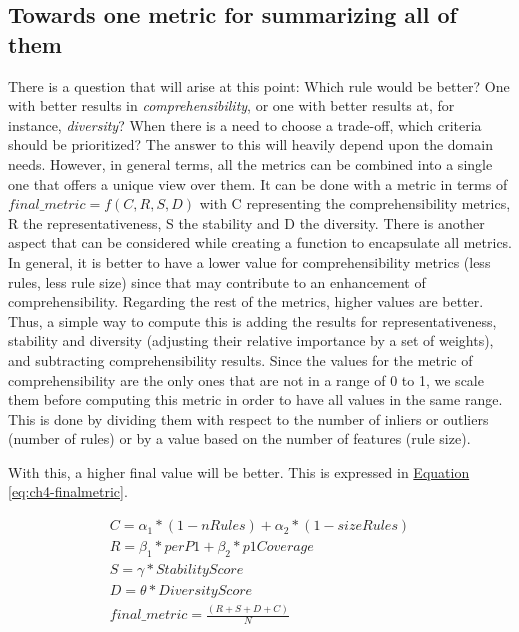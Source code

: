 \subsection{Towards one metric for summarizing all of them}\label{subsec:RuleExtractionOneMetric}
There is a question that will arise at this point: Which rule would be better? One with better results in \textit{comprehensibility}, or one with better results at, for instance, \textit{diversity}? When there is a need to choose a trade-off, which criteria should be prioritized? 
The answer to this will heavily depend upon the domain needs. However, in general terms, all the metrics can be combined into a single one that offers a unique view over them. It can be done with a metric in terms of $final\_metric = f(C, R, S, D)$ with C representing the comprehensibility metrics, R the representativeness, S the stability and D the diversity. There is another aspect that can be considered while creating a function to encapsulate all metrics. In general, it is better to have a lower value for comprehensibility metrics (less rules, less rule size) since that may contribute to an enhancement of comprehensibility. Regarding the rest of the metrics, higher values are better. Thus, a simple way to compute this is adding the results for representativeness, stability and diversity (adjusting their relative importance by a set of weights), and subtracting comprehensibility results. Since the values for the metric of comprehensibility are the only ones that are not in a range of 0 to 1, we scale them before computing this metric in order to have all values in the same range. This is done by dividing them with respect to the number of inliers or outliers (number of rules) or by a value based on the number of features (rule size).

With this, a higher final value will be better. This is expressed in \hyperref[eq:ch4-finalmetric]{Equation} \ref{eq:ch4-finalmetric}.

\begin{equation}\label{eq:ch4-finalmetric}
\begin{split}
  C = {\alpha_1 * (1 - nRules) + \alpha_2 * (1 - sizeRules)} \\
  R = \beta_1 * perP1 + \beta_2 * p1Coverage \\
  S = \gamma*StabilityScore \\
  D = \theta*DiversityScore \\
  final\_metric = \frac{(R + S + D + C)}{N} \\
\end{split}
\end{equation}

